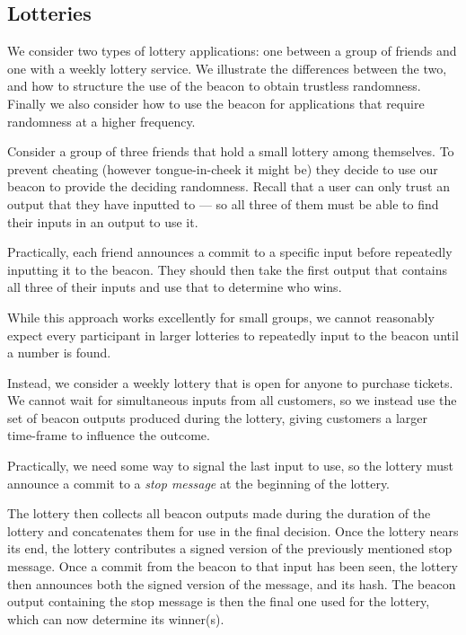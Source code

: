 
\subsection{Lotteries}
We consider two types of lottery applications: one between a group of friends and one with a weekly lottery service. We illustrate the differences between the two, and how to structure the use of the beacon to obtain trustless randomness. Finally we also consider how to use the beacon for applications that require randomness at a higher frequency.

Consider a group of three friends that hold a small lottery among themselves. To prevent cheating (however tongue-in-cheek it might be) they decide to use our beacon to provide the deciding randomness. Recall that a user can only trust an output that they have inputted to --- so all three of them must be able to find their inputs in an output to use it.

Practically, each friend announces a commit to a specific input before repeatedly inputting it to the beacon. They should then take the first output that contains all three of their inputs and use that to determine who wins.

While this approach works excellently for small groups, we cannot reasonably expect every participant in larger lotteries to repeatedly input to the beacon until a number is found.

Instead, we consider a weekly lottery that is open for anyone to purchase tickets. We cannot wait for simultaneous inputs from all customers, so we instead use the set of beacon outputs produced during the lottery, giving customers a larger time-frame to influence the outcome.

Practically, we need some way to signal the last input to use, so the lottery must announce a commit to a \textit{stop message} at the beginning of the lottery.

The lottery then collects all beacon outputs made during the duration of the lottery and concatenates them for use in the final decision. Once the lottery nears its end, the lottery contributes a signed version of the previously mentioned stop message. Once a commit from the beacon to that input has been seen, the lottery then announces both the signed version of the message, and its hash. The beacon output containing the stop message is then the final one used for the lottery, which can now determine its winner(s).

